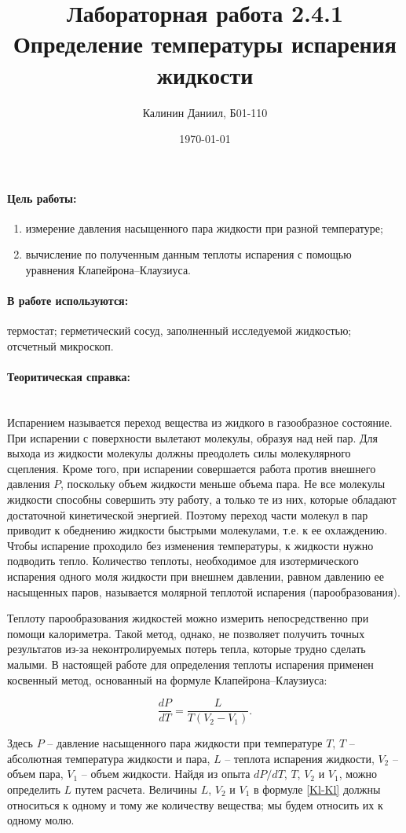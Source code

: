 \documentclass[a4paper, 12pt]{article}
\author{Калинин Даниил, Б01-110}
\date{\today}
\title{Лабораторная работа 2.4.1\\Определение температуры испарения жидкости}
\newcommand{\parag}[1]{\paragraph*{#1:}}
\begin{document}
\maketitle

\parag {Цель работы}
\begin{enumerate}
	\item измерение давления насыщенного пара жидкости при разной температуре;
	\item вычисление по полученным данным теплоты испарения с помощью уравнения Клапейрона–Клаузиуса.
\end{enumerate}

\parag {В работе используются}
термостат; герметический сосуд, заполненный исследуемой жидкостью; отсчетный микроскоп.

\parag {Теоритическая справка} ~\\
Испарением называется переход вещества из жидкого в газообразное состояние. При испарении с поверхности вылетают молекулы, образуя над ней пар. Для выхода из жидкости молекулы должны преодолеть силы молекулярного сцепления. Кроме того, при испарении совершается работа против внешнего давления $ P $, поскольку объем жидкости меньше объема пара. Не все молекулы жидкости способны совершить эту работу, а только те из них, которые обладают достаточной кинетической энергией. Поэтому переход части молекул в пар приводит к обеднению жидкости быстрыми молекулами, т.е. к ее охлаждению. Чтобы испарение проходило без изменения температуры, к жидкости нужно подводить тепло. Количество теплоты, необходимое для изотермического испарения одного моля жидкости при внешнем давлении, равном давлению ее насыщенных паров, называется молярной теплотой испарения (парообразования).

Теплоту парообразования жидкостей можно измерить непосредственно при помощи калориметра. Такой метод, однако, не позволяет получить точных результатов из-за неконтролируемых потерь тепла, которые трудно сделать малыми. В настоящей работе для определения теплоты испарения применен косвенный метод, основанный на формуле Клапейрона–Клаузиуса:

\begin{equation}\label{Kl-Kl}
\frac{dP}{dT}=\frac{L}{T\left(V_2-V_1\right)}.
\end{equation}

Здесь $ P $ -- давление насыщенного пара жидкости при температуре $ T $, $ T $ -- абсолютная температура жидкости и пара, $ L $ -- теплота испарения жидкости, $ V_2 $ -- объем пара, $ V_1 $ -- объем жидкости. Найдя из опыта $ dP/dT $, $ T $, $ V_2 $ и $ V_1 $, можно определить $ L $ путем расчета. Величины $ L $, $ V_2 $ и $ V_1 $ в формуле \eqref{Kl-Kl} должны относиться к одному и тому же количеству вещества; мы будем относить их к одному молю.
\end{document}
